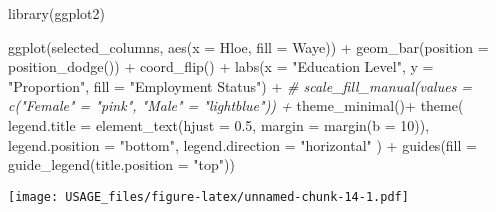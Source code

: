 \documentclass[
]{article}
\newenvironment{Shaded}{\begin{snugshade}}{\end{snugshade}}
\newcommand{\AttributeTok}[1]{\textcolor[rgb]{0.77,0.63,0.00}{#1}}
\newcommand{\CommentTok}[1]{\textcolor[rgb]{0.56,0.35,0.01}{\textit{#1}}}
\newcommand{\DecValTok}[1]{\textcolor[rgb]{0.00,0.00,0.81}{#1}}
\newcommand{\FloatTok}[1]{\textcolor[rgb]{0.00,0.00,0.81}{#1}}
\newcommand{\FunctionTok}[1]{\textcolor[rgb]{0.00,0.00,0.00}{#1}}
\newcommand{\NormalTok}[1]{#1}
\newcommand{\SpecialCharTok}[1]{\textcolor[rgb]{0.00,0.00,0.00}{#1}}
\newcommand{\StringTok}[1]{\textcolor[rgb]{0.31,0.60,0.02}{#1}}
\begin{document}
\begin{Shaded}
\begin{Highlighting}[]
\FunctionTok{library}\NormalTok{(ggplot2)}

\FunctionTok{ggplot}\NormalTok{(selected\_columns, }\FunctionTok{aes}\NormalTok{(}\AttributeTok{x =}\NormalTok{ Hloe, }\AttributeTok{fill =}\NormalTok{ Waye)) }\SpecialCharTok{+}
  \FunctionTok{geom\_bar}\NormalTok{(}\AttributeTok{position =} \FunctionTok{position\_dodge}\NormalTok{()) }\SpecialCharTok{+}
  \FunctionTok{coord\_flip}\NormalTok{() }\SpecialCharTok{+}
  \FunctionTok{labs}\NormalTok{(}\AttributeTok{x =} \StringTok{"Education Level"}\NormalTok{, }\AttributeTok{y =} \StringTok{"Proportion"}\NormalTok{, }\AttributeTok{fill =} \StringTok{"Employment Status"}\NormalTok{) }\SpecialCharTok{+}
  \CommentTok{\# scale\_fill\_manual(values = c("Female" = "pink", "Male" = "lightblue")) +}
  \FunctionTok{theme\_minimal}\NormalTok{()}\SpecialCharTok{+}
  \FunctionTok{theme}\NormalTok{(}
    \AttributeTok{legend.title =} \FunctionTok{element\_text}\NormalTok{(}\AttributeTok{hjust =} \FloatTok{0.5}\NormalTok{, }\AttributeTok{margin =} \FunctionTok{margin}\NormalTok{(}\AttributeTok{b =} \DecValTok{10}\NormalTok{)),}
    \AttributeTok{legend.position =} \StringTok{"bottom"}\NormalTok{,}
    \AttributeTok{legend.direction =} \StringTok{"horizontal"}
\NormalTok{  ) }\SpecialCharTok{+}
  \FunctionTok{guides}\NormalTok{(}\AttributeTok{fill =} \FunctionTok{guide\_legend}\NormalTok{(}\AttributeTok{title.position =} \StringTok{"top"}\NormalTok{))}
\end{Highlighting}
\end{Shaded}

\texttt{[image: USAGE\_files/figure-latex/unnamed-chunk-14-1.pdf]}
\end{document}
